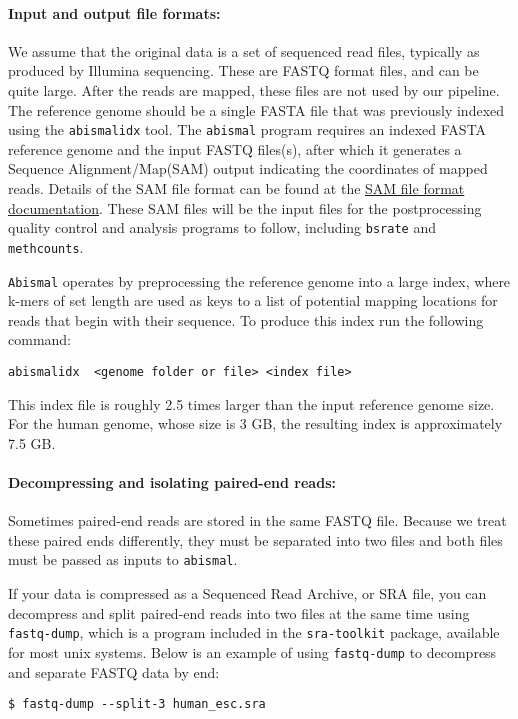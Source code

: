 \documentclass[10pt]{article}
\newcommand{\prog}[1]{\texttt{#1}}
\begin{document}
\paragraph{Input and output file formats:} We assume that the original
data is a set of sequenced read files, typically as produced by
Illumina sequencing. These are FASTQ format files, and can be quite
large. After the reads are mapped, these files are not used by our
pipeline. The reference genome should be a single FASTA file that was
previously indexed using the \prog{abismalidx} tool. The
\prog{abismal} program requires an indexed FASTA reference genome and
the input FASTQ files(s), after which it generates a Sequence
Alignment/Map(SAM) output indicating the coordinates of mapped reads.
Details of the SAM file format can be found at the
\href{http://samtools.github.io/hts-specs/SAMv1.pdf}{SAM file format
documentation}. These SAM files will be the input files for the
postprocessing quality control and analysis programs to follow,
including \prog{bsrate} and
\prog{methcounts}.

\prog{Abismal} operates by preprocessing the reference genome into a large
index, where k-mers of set length are used as keys to a list of potential
mapping locations for reads that begin with their sequence. To produce
this index run the following command:

\begin{verbatim}
abismalidx  <genome folder or file> <index file>
\end{verbatim}

This index file is roughly 2.5 times larger than the input reference genome
size. For the human genome, whose size is 3 GB, the resulting index is
approximately 7.5 GB. 

\paragraph{Decompressing and isolating paired-end reads:}
Sometimes paired-end reads are stored in the same FASTQ file.  Because
we treat these paired ends differently, they must be separated into
two files and both files must be passed as inputs to \prog{abismal}.

If your data is compressed as a Sequenced Read Archive, or SRA file, you can
decompress and split paired-end reads into two files at the same time using
\prog{fastq-dump}, which is a program included in the \prog{sra-toolkit}
package, available for most unix systems.  Below is an example of using
\prog{fastq-dump} to decompress and separate FASTQ data by end:
\begin{verbatim}
$ fastq-dump --split-3 human_esc.sra
\end{verbatim}
\end{document}
